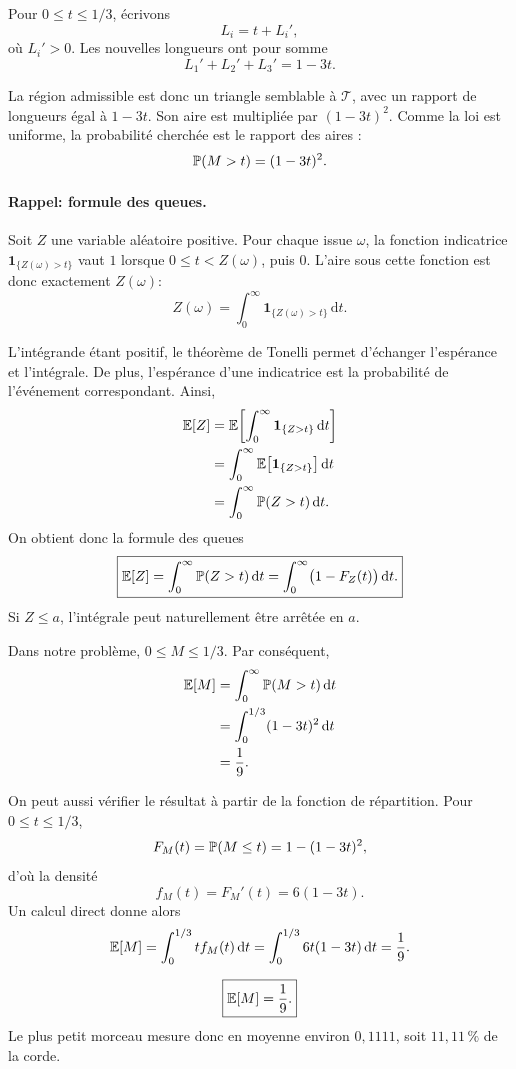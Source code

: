 \documentclass[11pt,a4paper]{article}
\begin{document}
Pour $0\leq t\leq1/3$, écrivons
\[
L_i=t+L_i',
\]
où $L_i'>0$. Les nouvelles longueurs ont pour somme
\[
L_1'+L_2'+L_3'=1-3t.
\]
\par\noindent
La région admissible est donc un triangle semblable à $\mathcal T$, avec un
rapport de longueurs égal à $1-3t$. Son aire est multipliée par
$(1-3t)^2$. Comme la loi est uniforme, la probabilité cherchée est le rapport
des aires :
\[
\mathbb P(M>t)=(1-3t)^2.
\]

\paragraph{Rappel: formule des queues.}
Soit $Z$ une variable aléatoire positive. Pour chaque issue $\omega$, la
fonction indicatrice $\mathbf 1_{\{Z(\omega)>t\}}$ vaut $1$ lorsque
$0\leq t<Z(\omega)$, puis $0$. L'aire sous cette fonction est donc exactement
$Z(\omega)$:
\[
Z(\omega)
=\int_0^\infty
\mathbf 1_{\{Z(\omega)>t\}}\,\mathrm dt.
\]
\par\noindent
L'intégrande étant positif, le théorème de Tonelli permet d'échanger
l'espérance et l'intégrale. De plus, l'espérance d'une indicatrice est la
probabilité de l'événement correspondant. Ainsi,
\[
\begin{aligned}
\mathbb E[Z]
&=\mathbb E\!\left[
  \int_0^\infty \mathbf 1_{\{Z>t\}}\,\mathrm dt
\right]\\
&=\int_0^\infty
  \mathbb E\!\left[\mathbf 1_{\{Z>t\}}\right]\mathrm dt\\
&=\int_0^\infty \mathbb P(Z>t)\,\mathrm dt.
\end{aligned}
\]
On obtient donc la formule des queues
\[
\boxed{
\mathbb E[Z]=\int_0^\infty \mathbb P(Z>t)\,\mathrm dt
=\int_0^\infty \bigl(1-F_Z(t)\bigr)\,\mathrm dt.}
\]
Si $Z\leq a$, l'intégrale peut naturellement être arrêtée en $a$.

Dans notre problème, $0\leq M\leq1/3$. Par conséquent,
\[
\begin{aligned}
\mathbb E[M]
&=\int_0^{\infty}\mathbb P(M>t)\,\mathrm dt\\
&=\int_0^{1/3}(1-3t)^2\,\mathrm dt\\
&=\frac19.
\end{aligned}
\]

On peut aussi vérifier le résultat à partir de la fonction de répartition.
Pour $0\leq t\leq1/3$,
\[
F_M(t)=\mathbb P(M\leq t)=1-(1-3t)^2,
\]
d'où la densité
\[
f_M(t)=F_M'(t)=6(1-3t).
\]
Un calcul direct donne alors
\[
\mathbb E[M]
=\int_0^{1/3}t f_M(t)\,\mathrm dt
=\int_0^{1/3}6t(1-3t)\,\mathrm dt
=\frac19.
\]

\begin{resultbox}
\[
\boxed{\mathbb E[M]=\frac19.}
\]
Le plus petit morceau mesure donc en moyenne environ $0{,}1111$, soit
$11{,}11\,\%$ de la corde.
\end{resultbox}
\end{document}
